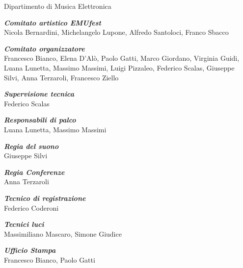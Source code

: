 \documentclass[9pt, twoside, a5paper]{extreport}
\begin{document}
{

\medskip

{\fontsize{12}{12}\selectfont \textsf{Dipartimento di Musica Elettronica}}\\

\vspace{.5cm}

\textbf{\textit{Comitato artistico EMUfest}}\\
Nicola Bernardini, Michelangelo Lupone, Alfredo Santoloci, Franco Sbacco

\medskip

\textbf{\textit{Comitato organizzatore}}\\
Francesco Bianco, Elena D'Alò, Paolo Gatti, Marco Giordano, Virginia Guidi, Luana Lunetta, Massimo Massimi, Luigi Pizzaleo, Federico Scalas, Giuseppe Silvi, Anna Terzaroli, Francesco Ziello

\medskip

\textbf{\textit{Supervisione tecnica}}\\

Federico Scalas

\medskip

\textbf{\textit{Responsabili di palco}}\\

Luana Lunetta, Massimo Massimi

\medskip

\textbf{\textit{Regia del suono}}\\

Giuseppe Silvi

\medskip

\textbf{\textit{Regia Conferenze}}\\

Anna Terzaroli

\medskip

\textbf{\textit{Tecnico di registrazione}}\\

Federico Coderoni

\medskip

\textbf{\textit{Tecnici luci}}\\

Massimiliano Mascaro, Simone Giudice

\medskip

\textbf{\textit{Ufficio Stampa}}\\

Francesco Bianco, Paolo Gatti

}
\end{document}
